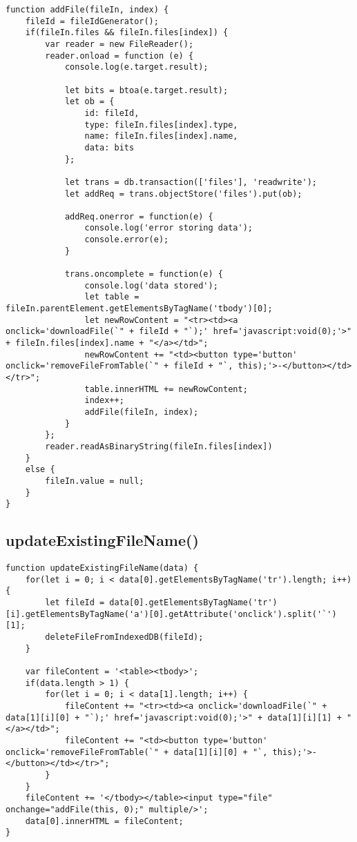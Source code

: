 \documentclass[letterpaper]{article}
\begin{document}
\begin{lstlisting}[firstnumber=78]
function addFile(fileIn, index) {
    fileId = fileIdGenerator();
    if(fileIn.files && fileIn.files[index]) {
        var reader = new FileReader();
        reader.onload = function (e) {
            console.log(e.target.result);

            let bits = btoa(e.target.result);
            let ob = {
                id: fileId,
                type: fileIn.files[index].type,
                name: fileIn.files[index].name,
                data: bits
            };

            let trans = db.transaction(['files'], 'readwrite');
            let addReq = trans.objectStore('files').put(ob);

            addReq.onerror = function(e) {
                console.log('error storing data');
                console.error(e);
            }

            trans.oncomplete = function(e) {
                console.log('data stored');
                let table = fileIn.parentElement.getElementsByTagName('tbody')[0];
                let newRowContent = "<tr><td><a onclick='downloadFile(`" + fileId + "`);' href='javascript:void(0);'>" + fileIn.files[index].name + "</a></td>";
                newRowContent += "<td><button type='button' onclick='removeFileFromTable(`" + fileId + "`, this);'>-</button></td></tr>";
                table.innerHTML += newRowContent;
                index++;
                addFile(fileIn, index);
            }
        };
        reader.readAsBinaryString(fileIn.files[index])
    }
    else {
        fileIn.value = null;
    }
}
\end{lstlisting}

\subsection{updateExistingFileName()}

\begin{lstlisting}[firstnumber=118]
function updateExistingFileName(data) {
    for(let i = 0; i < data[0].getElementsByTagName('tr').length; i++) {
        let fileId = data[0].getElementsByTagName('tr')[i].getElementsByTagName('a')[0].getAttribute('onclick').split('`')[1];
        deleteFileFromIndexedDB(fileId);
    }

    var fileContent = '<table><tbody>';
    if(data.length > 1) {
        for(let i = 0; i < data[1].length; i++) {
            fileContent += "<tr><td><a onclick='downloadFile(`" + data[1][i][0] + "`);' href='javascript:void(0);'>" + data[1][i][1] + "</a></td>";
            fileContent += "<td><button type='button' onclick='removeFileFromTable(`" + data[1][i][0] + "`, this);'>-</button></td></tr>";
        }
    }
    fileContent += '</tbody></table><input type="file" onchange="addFile(this, 0);" multiple/>';
    data[0].innerHTML = fileContent;
}
\end{lstlisting}
\end{document}
